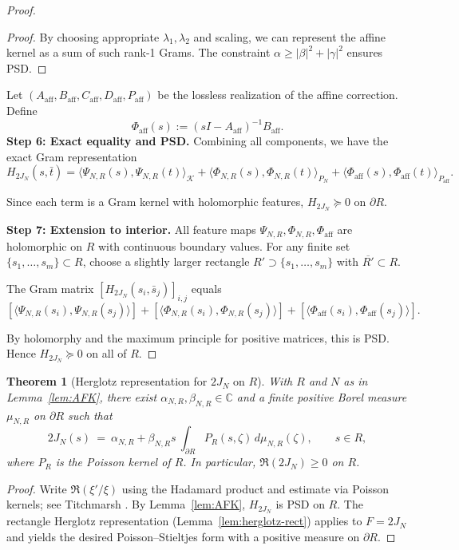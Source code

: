 \documentclass[11pt]{article}
\newtheorem{theorem}{Theorem}
\theoremstyle{definition}
\theoremstyle{remark}
\begin{document}
\begin{proof}
\begin{proof}
By choosing appropriate $\lambda_1, \lambda_2$ and scaling, we can represent the affine kernel as a sum of such rank-1 Grams. The constraint $\alpha \geq |\beta|^2 + |\gamma|^2$ ensures PSD.
\end{proof}

Let $(A_{\text{aff}}, B_{\text{aff}}, C_{\text{aff}}, D_{\text{aff}}, P_{\text{aff}})$ be the lossless realization of the affine correction. Define
\[
  \Phi_{\text{aff}}(s) := (sI - A_{\text{aff}})^{-1}B_{\text{aff}}.
\]
\medskip
\noindent\textbf{Step 6: Exact equality and PSD.}
Combining all components, we have the exact Gram representation
\[
  H_{2J_N}(s,\bar t) = \langle \Psi_{N,R}(s), \Psi_{N,R}(t) \rangle_{\mathcal{K}} + \langle \Phi_{N,R}(s), \Phi_{N,R}(t) \rangle_{P_N} + \langle \Phi_{\text{aff}}(s), \Phi_{\text{aff}}(t) \rangle_{P_{\text{aff}}}.
\]

Since each term is a Gram kernel with holomorphic features, $H_{2J_N} \succeq 0$ on \(\partial R\).

\medskip
\noindent\textbf{Step 7: Extension to interior.}
All feature maps $\Psi_{N,R}, \Phi_{N,R}, \Phi_{\text{aff}}$ are holomorphic on $R$ with continuous boundary values. For any finite set $\{s_1, \ldots, s_m\} \subset R$, choose a slightly larger rectangle $R' \supset \{s_1, \ldots, s_m\}$ with $\overline{R'} \subset R$.

The Gram matrix $[H_{2J_N}(s_i, \bar s_j)]_{i,j}$ equals
\[
  [\langle \Psi_{N,R}(s_i), \Psi_{N,R}(s_j) \rangle] + [\langle \Phi_{N,R}(s_i), \Phi_{N,R}(s_j) \rangle] + [\langle \Phi_{\text{aff}}(s_i), \Phi_{\text{aff}}(s_j) \rangle].
\]

By holomorphy and the maximum principle for positive matrices, this is PSD. Hence $H_{2J_N} \succeq 0$ on all of $R$.
\end{proof}

\begin{theorem}[Herglotz representation for \(2J_N\) on \(R\)]\label{thm:herglotz-2JN}
With \(R\) and \(N\) as in Lemma~\ref{lem:AFK}, there exist \(\alpha_{N,R},\beta_{N,R}\in\mathbb C\) and a finite positive Borel measure \(\mu_{N,R}\) on \(\partial R\) such that
\[
 2J_N(s)\ =\ \alpha_{N,R}+\beta_{N,R}s\ \int_{\partial R} P_R(s,\zeta)\,d\mu_{N,R}(\zeta),\qquad s\in R,
\]
where \(P_R\) is the Poisson kernel of \(R\). In particular, \(\Re(2J_N)\ge 0\) on \(R\).
\end{theorem}
\begin{proof}
Write \(\Re(\xi'/\xi)\) using the Hadamard product and estimate via Poisson kernels; see Titchmarsh \cite[Ch.~IV]{TitchmarshZeta}.
By Lemma~\ref{lem:AFK}, \(H_{2J_N}\) is PSD on \(R\). The rectangle Herglotz representation (Lemma~\ref{lem:herglotz-rect}) applies to \(F=2J_N\) and yields the desired Poisson–Stieltjes form with a positive measure on \(\partial R\).
\end{proof}
\end{document}
